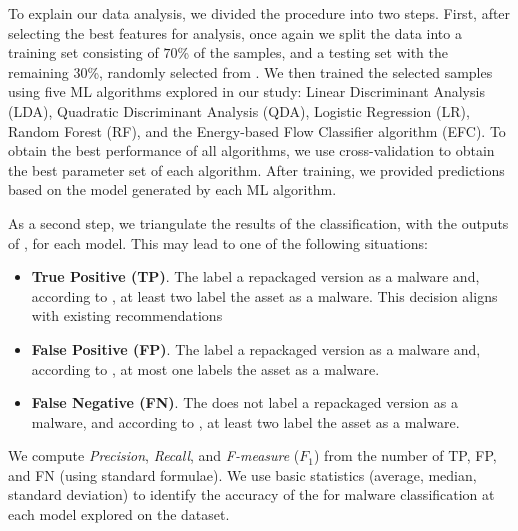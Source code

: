 

To explain our data analysis, we divided the procedure into two steps. First, after selecting the best features for analysis, once again we split the data into a training set consisting of $70$\% of the samples, and a testing set with the remaining $30$\%, randomly selected from \fds. We then trained the selected samples using five ML algorithms explored in our study: Linear Discriminant Analysis (LDA), Quadratic Discriminant Analysis (QDA), Logistic Regression (LR), Random Forest (RF), and the Energy-based Flow Classifier algorithm (EFC). To obtain the best performance of all algorithms, we use cross-validation to obtain the best parameter set of each algorithm. After training, we provided predictions based on the model generated by each ML algorithm.

As a second step, we triangulate the results of the \ml classification, with the outputs of \vt, for each model. This may lead to one of the following situations:

\begin{itemize}
\item {\bf True Positive (TP)}. The \ml label a repackaged version as a malware and, according to
  \vt, at least two \ses label the asset as a malware. This decision aligns with existing recommendations~\cite{vt-label,DBLP:journals/ese/KhanmohammadiEH19}
   
\item {\bf False Positive (FP)}. The \ml label a repackaged version as a malware and, according to \vt, at most one \se labels the asset as a malware.

\item {\bf False Negative (FN)}. The \ml does not label a repackaged version as a malware, and according to \vt, at least two \ses label the asset as a malware.
\end{itemize}

We compute \emph{Precision}, \emph{Recall}, and \emph{F-measure} ($F_1$) from
the number of TP, FP, and FN (using standard formulae). We use basic statistics (average, median, standard deviation) to identify the accuracy of the \ml for malware classification at each model explored on the \fds dataset.
